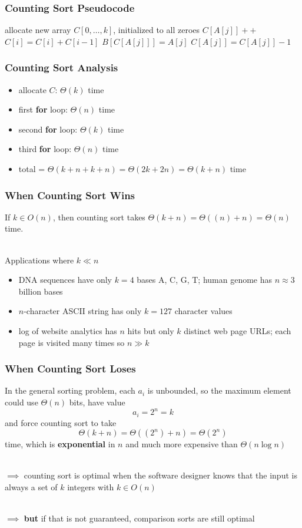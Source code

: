 \documentclass[10pt,aspectratio=169]{beamer}
\newcommand{\stanza}{ \\~\ }
\begin{document}
\begin{frame} \frametitle{Counting Sort Pseudocode}
  \begin{algorithmic}[1]
     
    \State allocate new array $C[0, \ldots, k]$, initialized to all zeroes
      \State $C[A[j]]++$ 
    \EndFor
      \State $C[i] = C[i] + C[i-1]$ 
    \EndFor
      \State $B[C[A[j]]] = A[j]$
      \State $C[A[j]] = C[A[j]] - 1$
    \EndFor
    \EndFunction
  \end{algorithmic}
\end{frame}

\begin{frame} \frametitle{Counting Sort Analysis}
\begin{itemize}
  \item allocate $C$: $\Theta(k)$ time
  \item first \textbf{for} loop: $\Theta(n)$ time
  \item second \textbf{for} loop: $\Theta(k)$ time
  \item third \textbf{for} loop: $\Theta(n)$ time
  \item total = $\Theta(k+n+k+n)=\Theta(2k+2n)=\Theta(k+n)$ time
\end{itemize}
\end{frame}

\begin{frame} \frametitle{When Counting Sort Wins}
  If $k \in O(n)$, then counting sort takes $\Theta(k+n)=\Theta((n)+n)=\Theta(n)$ time. \stanza

Applications where $k \ll n$
\begin{itemize}
\item DNA sequences have only $k=4$ bases A, C, G, T; human genome has $n \approx 3$ billion bases
\item $n$-character ASCII string has only $k=127$ character values
\item log of website analytics has $n$ hits but only $k$ distinct web page URLs;
  each page is visited many times so $n \gg k$
\end{itemize}
\end{frame}

\begin{frame} \frametitle{When Counting Sort Loses}
In the general sorting problem, each $a_i$ is unbounded, so the maximum element
could use $\Theta(n)$ bits, have value
\[ a_i = 2^n = k \]
and force counting sort to take
\[ \Theta(k+n)=\Theta((2^n)+n)=\Theta(2^n) \]
time, which is \textbf{exponential} in $n$ and much more expensive than
$\Theta(n \log n)$ \stanza

$\implies$ counting sort is optimal when the software designer knows that the
input is always a set of $k$ integers with $k \in O(n)$ \stanza

$\implies$ \textbf{but} if that is not guaranteed, comparison sorts are still optimal
\end{frame}
\end{document}
